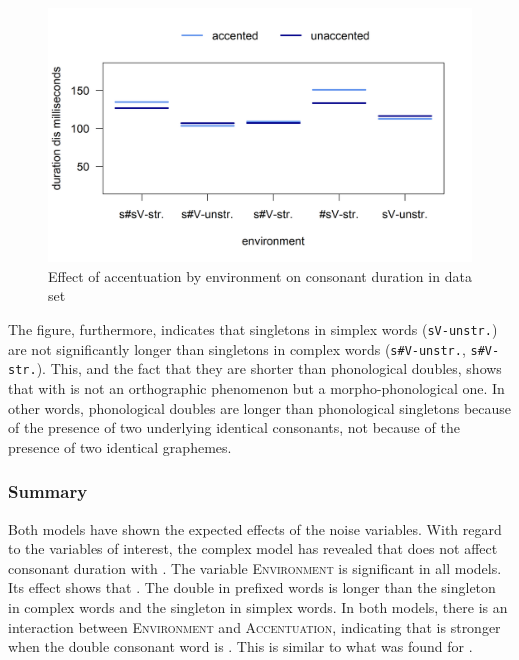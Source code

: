 \begin{figure}
	
	\includegraphics [scale=0.5] {images/Experiment/disModelCompleteinterEnvAcc}
	\caption{Effect of accentuation by environment on consonant duration in data set}
	\label{fig:  dis experiment Env and accent}
\end{figure}


The figure, furthermore, indicates that singletons in simplex words (\texttt{sV-unstr.}) are not significantly longer than singletons in complex words (\texttt{s\#V-unstr.}, \texttt{s\#V- str.}). This, and the fact that they are shorter than phonological doubles, shows that  with  is not an orthographic phenomenon but a morpho-phonological one. In other words, phonological doubles are longer than phonological singletons because of the presence of two underlying identical consonants, not because of the presence of two identical graphemes.



\subsubsection{Summary}

Both models have shown the expected effects of the noise variables. With regard to the variables of interest, the complex model has revealed that  does not affect consonant duration with . The variable \textsc{Environment} is significant in all models. Its effect shows that  . The double in prefixed words is longer than the singleton in complex words and the singleton in simplex words. 
In both models, there is an interaction between \textsc{Environment} and \textsc{Accentuation}, indicating that  is stronger when the double consonant word is . This is similar to what was found for .

